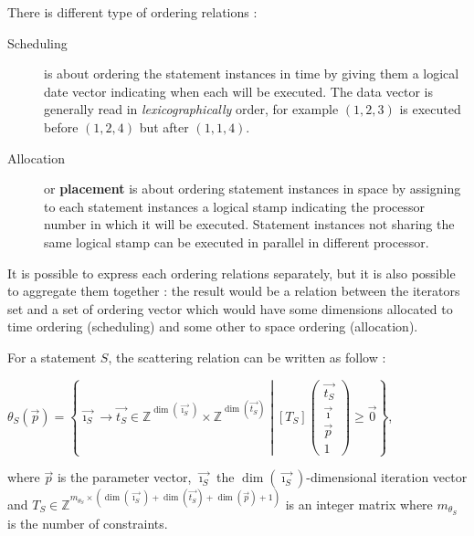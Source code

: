 \documentclass[paper=a4, fontsize=11.5pt]{scrartcl}
\numberwithin{equation}{section}        %
\numberwithin{figure}{section}          %
\numberwithin{table}{section}               %
\begin{document}
        There is different type of ordering relations :
        \begin{description}
            \item[Scheduling] is about ordering the statement instances in time by
                giving them a logical date vector indicating when each will be executed.
                The data vector is generally read in \textit{lexicographically} order, for example
                $(1,2,3)$ is executed before $(1,2,4)$ but after $(1,1,4)$.
            \item[Allocation] or \textbf{placement} is about ordering statement instances
                in space by assigning to each statement instances a logical stamp
                indicating the processor number in which it will be executed.
                Statement instances not sharing the same logical stamp can be
                executed in parallel in different processor.
        \end{description}

        It is possible to express each ordering relations separately,
        but it is also possible to aggregate them together : the result would be
        a relation between the iterators set and a set of ordering vector which
        would have some dimensions allocated to time ordering (scheduling) and
        some other to space ordering (allocation).

        For a statement $S$, the scattering relation can be written as follow :
        \begin{center}
            $\theta_S(\vec{p}) = \left\{\vec{\imath_S} \to \vec{t_S} \in \mathbb{Z}^{\dim(\vec{\imath_S})}\times\mathbb{Z}^{\dim(\vec{t_S})}
            \middle|
            \left[T_S\right]\begin{pmatrix}\vec{t_S}\\ \vec{\imath} \\ \vec{p} \\ 1\end{pmatrix}
            \geq \vec{0}
            \right\}$,
        \end{center}
        where $\vec{p}$ is the parameter vector, $\vec{\imath_S}$ the $\dim(\vec{\imath_S})$-dimensional iteration vector
        and $T_S \in \mathbb{Z}^{m_{\theta_S}\times(\dim(\vec{\imath_S})+\dim(\vec{t_S})+\dim(\vec{p})+1)}$
        is an integer matrix where $m_{\theta_S}$ is the number of constraints.
\end{document}
